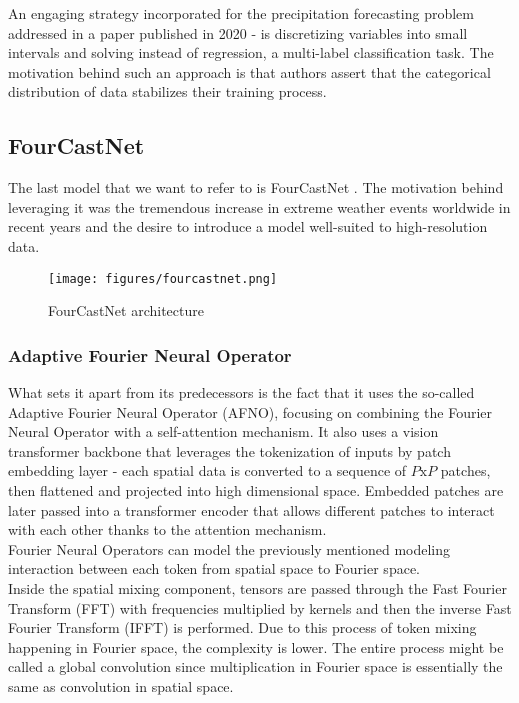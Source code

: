  \noindent An engaging strategy incorporated for the precipitation forecasting problem addressed in a paper published in 2020 - is discretizing variables into small intervals and solving instead of regression, a multi-label classification task. The motivation behind such an approach is that authors assert that the categorical distribution of data stabilizes their training process. 

\subsection{FourCastNet}
The last model that we want to refer to is FourCastNet \cite{pathak2022fourcastnet}. The motivation behind leveraging it was the tremendous increase in extreme weather events worldwide in recent years and the desire to introduce a model well-suited to high-resolution data.

\begin{figure}[!ht]
    \centering
    \texttt{[image: figures/fourcastnet.png]}
    \caption{FourCastNet architecture}
    \label{fig:fourcastnet}
\end{figure}


\subsubsection{Adaptive Fourier Neural Operator}

What sets it apart from its predecessors is the fact that it uses the so-called Adaptive Fourier Neural Operator (AFNO), focusing on combining the Fourier Neural Operator with a self-attention mechanism.
It also uses a vision transformer backbone that leverages the tokenization of inputs by patch embedding layer - each spatial data is converted to a sequence of $P\text{x}P$ patches, then flattened and projected into high dimensional space.
Embedded patches are later passed into a transformer encoder that allows different patches to interact with each other thanks to the attention mechanism. \\

\noindent Fourier Neural Operators can model the previously mentioned modeling interaction between each token from spatial space to Fourier space. \\

\noindent Inside the spatial mixing component, tensors are passed through the Fast Fourier Transform (FFT) with frequencies multiplied by kernels and then the inverse Fast Fourier Transform (IFFT) is performed. Due to this process of token mixing happening in Fourier space, the complexity is lower. The entire process might be called a global convolution since multiplication in Fourier space is essentially the same as convolution in spatial space. \\

